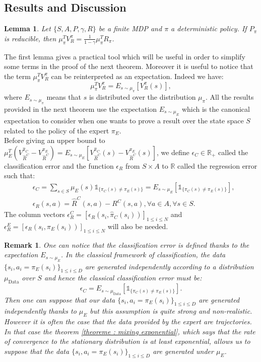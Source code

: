 \documentclass{article} %
\newtheorem{lemma}{Lemma}
\newtheorem{remark}{Remark}
\newcommand{\0}{\mathbf{0}}
\newcommand{\1}{\mathbf{1}}
\begin{document}
\subsection{Results and Discussion}
\begin{lemma}
\label{lemma: calculs V}
Let $\{S,A,P,\gamma,R\}$ be a finite MDP and $\pi$ a deterministic policy.
If $P_\pi$ is reducible, then $\mu_\pi^TV^\pi_R=\frac{1}{1-\gamma}\mu_\pi^TR_\pi$.
\end{lemma}
The first lemma gives a practical tool which will be useful in order to simplify some terms in the proof of the next theorem. Moreover it is useful
to notice that the term  $\mu_\pi^TV^\pi_R$ can be reinterpreted as an expectation. Indeed we have:
\begin{equation}
\mu_\pi^TV^\pi_R=E_{s \sim \mu_\pi}[V^\pi_R(s)],
\end{equation}
where $E_{s \sim \mu_\pi}$ means that $s$ is distributed over the distribution $\mu_\pi$. All the results provided in the next theorem use the expectation $E_{s \sim \mu_E}$ which is the canonical expectation to consider when one wants to prove a result over the state space $S$ related to the policy of the expert $\pi_E$.\\
Before giving an upper bound to $\mu_E^T(V^{\hat{\pi}_C}_{\hat{R}^C}-V^{\pi_E}_{\hat{R}^C})=E_{s \sim \mu_E}[V^{\hat{\pi}_C}_{\hat{R}^C}(s)-V^{\pi_E}_{\hat{R}^C}(s)]$, we define $\epsilon_C\in\mathbb{R}_+$ called the classification error and the function $\epsilon_R$ from $S\times A$ to $\mathbb{R}$ called the regression error such that:
\begin{align}
&\epsilon_C=\sum_{s\in S}\mu_{E}(s)\mathds{1}_{\{\pi_C(s)\neq\pi_E(s)\}}=E_{s \sim \mu_E}[\mathds{1}_{\{\pi_C(s)\neq\pi_E(s)\}}],
\\
&\epsilon_R(s,a)=\hat{R}^C(s,a)-R^C(s,a), \forall a\in A, \forall s\in S.
\end{align}
The column vectors $\epsilon^C_R=[\epsilon_R(s_i,\hat{\pi}_C(s_i))]_{1\leq i \leq N}$ and $\epsilon^E_R=[\epsilon_R(s_i,\pi_E(s_i))]_{1\leq i \leq N}$ will also be needed.
\begin{remark}
One can notice that the classification error is defined thanks to the expectation $E_{s \sim \mu_E}$. In the classical framework of classification, the data $\{s_i,a_i=\pi_E(s_i)\}_{1\leq i \leq D}$ are generated independently according to a distribution $\mu_{\text{Data}}$ over $S$ and hence the classical classification error must be:
\begin{equation}
\epsilon_C=E_{s \sim \mu_{\text{Data}}}[\mathds{1}_{\{\pi_C(s)\neq\pi_E(s)\}}].
\end{equation}
Then one can suppose that our data $\{s_i,a_i=\pi_E(s_i)\}_{1\leq i \leq D}$ are generated independently thanks to $\mu_E$ but this assumption is quite strong and non-realistic.
However it is often the case that the data provided by the expert are trajectories. In that case the theorem \ref{theoreme : mixing exponential}, which says that the rate of convergence
to the stationary distribution is at least exponential, allows us to suppose that the data $\{s_i,a_i=\pi_E(s_i)\}_{1\leq i \leq D}$ are generated under $\mu_E$.
\end{remark}
\end{document}
